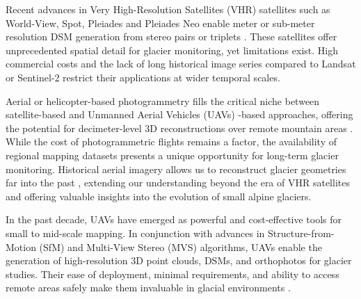 Recent advances in Very High-Resolution Satellites (VHR) satellites such as World-View, Spot, Pleiades and Pleiades Neo enable meter or sub-meter resolution DSM generation from stereo pairs or triplets \citep{rupnik2018_VHR, Perko218, Tonolo2020}.
These satellites offer unprecedented spatial detail for glacier monitoring, yet limitations exist.
High commercial costs and the lack of long historical image series compared to Landsat or Sentinel-2 restrict their applications at wider temporal scales.

Aerial or helicopter-based photogrammetry fills the critical niche between satellite-based and Unmanned Aerial Vehicles (UAVs) -based approaches, offering the potential for decimeter-level 3D reconstructions over remote mountain areas \citep{poli2020use}. 
While the cost of photogrammetric flights remains a factor, the availability of regional mapping datasets presents a unique opportunity for long-term glacier monitoring. Historical aerial imagery allows us to reconstruct glacier geometries far into the past \citep{Degaetani2021}, extending our understanding beyond the era of VHR satellites and offering valuable insights into the evolution of small alpine glaciers.

In the past decade, UAVs have emerged as powerful and cost-effective tools for small to mid-scale mapping.
In conjunction with advances in Structure-from-Motion (SfM) \citep{Westoby2012} and Multi-View Stereo (MVS) \citep{Seitz2006} algorithms,  UAVs enable the generation of high-resolution 3D point clouds, DSMs, and orthophotos for glacier studies. 
Their ease of deployment, minimal requirements, and ability to access remote areas safely make them invaluable in glacial environments \citep{immerzeel2014, Chudley2019, ioli2021mid}. 


